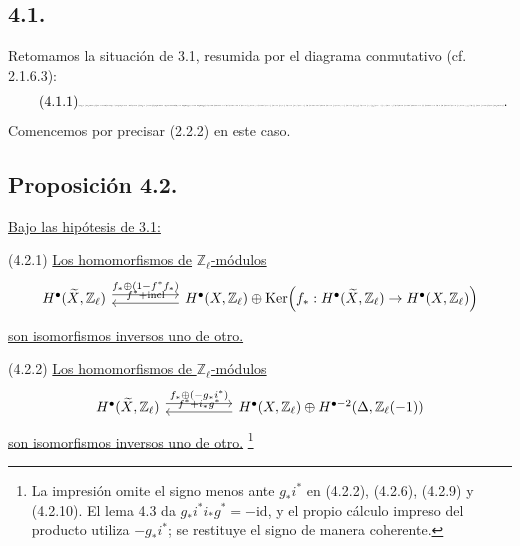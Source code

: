 \subsection*{4.1.}
Retomamos la situación de 3.1, resumida por el diagrama conmutativo
(cf. 2.1.6.3):
\begin{equation}\tag{4.1.1}
\resizebox{\dimexpr\textwidth-4em\relax}{!}{%
\begin{adjustbox}{max width=\dimexpr\displaywidth-5em\relax}\begin{tikzcd}[ampersand replacement=\&,row sep=huge,column sep=huge]
X\times\mathbb P^1
  \& \widetilde X
      \arrow[l,hook',"f\times\rho"]
      \arrow[d,"f"]
      \arrow[dl,"\rho"']
  \& \widetilde\Delta
      \arrow[l,hook',"i"]
      \arrow[d,"g"]
      \arrow[r,"{(g,\rho_i)}","\sim"']
  \& \Delta\times\mathbb P^1 \\
\mathbb P^1 \& X \& \Delta\arrow[l,hook',"j"] \& {}
\end{tikzcd}\end{adjustbox}}.
\end{equation}
Comencemos por precisar (2.2.2) en este caso.

\subsection*{Proposición 4.2.}
\underline{Bajo las hipótesis de 3.1:}

\smallskip
\noindent
\textup{(4.2.1)} \underline{Los homomorfismos de}
$\mathbb Z_\ell$\underline{-módulos}
\[
\begin{tikzcd}[column sep=huge]
H^\bullet(\widetilde X,\mathbb Z_\ell)
  \arrow[r,shift left=.7ex,"f_*\oplus(1-f^*f_*)"]
& H^\bullet(X,\mathbb Z_\ell)\oplus
   \operatorname{Ker}\!\left(f_*:H^\bullet(\widetilde X,\mathbb Z_\ell)
       \to H^\bullet(X,\mathbb Z_\ell)\right)
  \arrow[l,shift left=.7ex,"f^*+\operatorname{incl}"']
\end{tikzcd}
\]
\underline{son isomorfismos inversos uno de otro.}

\pageoriginale

\smallskip
\noindent
\textup{(4.2.2)} \underline{Los homomorfismos de
$\mathbb Z_\ell$-módulos}
\[
\begin{tikzcd}[column sep=huge]
H^\bullet(\widetilde X,\mathbb Z_\ell)
  \arrow[r,shift left=.7ex,
    "f_*\oplus(\sisi{}{ -}g_*i^*)"]
& H^\bullet(X,\mathbb Z_\ell)\oplus
   H^{\bullet-2}(\Delta,\mathbb Z_\ell(-1))
  \arrow[l,shift left=.7ex,"f^*+i_*g^*"']
\end{tikzcd}
\]
\underline{son isomorfismos inversos uno de otro.}
\footnote{La impresión omite el signo menos ante $g_*i^*$ en
(4.2.2), (4.2.6), (4.2.9) y (4.2.10). El lema 4.3 da
$g_*i^*i_*g^*=-\mathrm{id}$, y el propio cálculo impreso del producto
utiliza $-g_*i^*$; se restituye el signo de manera coherente.}

